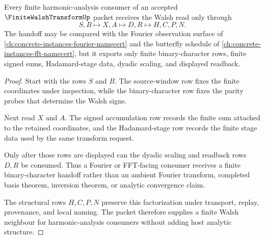 \begin{theorem}
\label{thm:finite-walsh-transform-binary-character-handoff}
Every finite harmonic-analysis consumer of an accepted $\FiniteWalshTransformUp$ packet receives the Walsh read only through
$$
S,B \longmapsto X,A \longmapsto D,R \longmapsto H,C,P,N .
$$
The handoff may be compared with the Fourier observation surface of \autoref{ch:concrete-instances-fourier-namecert} and the butterfly schedule of \autoref{ch:concrete-instances-fft-namecert}, but it exports only finite binary-character rows, finite signed sums, Hadamard-stage data, dyadic scaling, and displayed readback.
\end{theorem}
\begin{proof}
Start with the rows $S$ and $B$. The source-window row fixes the finite coordinates under inspection, while the binary-character row fixes the parity probes that determine the Walsh signs.

Next read $X$ and $A$. The signed accumulation row records the finite sum attached to the retained coordinates, and the Hadamard-stage row records the finite stage data used by the same transform request.

Only after those rows are displayed can the dyadic scaling and readback rows $D,R$ be consumed. Thus a Fourier or FFT-facing consumer receives a finite binary-character handoff rather than an ambient Fourier transform, completed basis theorem, inversion theorem, or analytic convergence claim.

The structural rows $H,C,P,N$ preserve this factorization under transport, replay, provenance, and local naming. The packet therefore supplies a finite Walsh neighbour for harmonic-analysis consumers without adding host analytic structure.
\end{proof}



